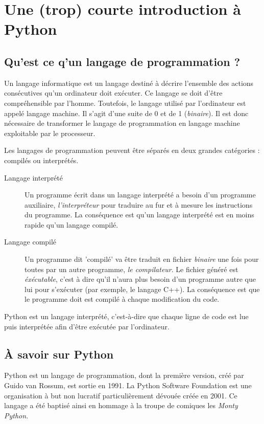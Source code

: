 \section{Une (trop) courte introduction \`a Python}

\subsection{Qu'est ce q'un langage de programmation ?}

Un langage informatique est un langage destin\'e \`a d\'ecrire l'ensemble des actions cons\'ecutives qu'un ordinateur doit ex\'ecuter.
Ce langage se doit d'\^etre compr\'ehensible par l'homme.
Toutefois, le langage utilis\'e par l'ordinateur est appel\'e langage machine.
Il s'agit d'une suite de 0 et de 1 (\textit{binaire}).
Il est donc n\'ecessaire de transformer le langage de programmation en langage
machine exploitable par le processeur.

Les langages de programmation peuvent \^etre s\'epar\'es en deux grandes cat\'egories : compil\'es ou interpr\'et\'es.
\begin{description}
\item[Langage interpr\'et\'e] Un programme \'ecrit dans un langage interpr\'et\'e a besoin d'un programme auxiliaire,
  \textit{l'interpr\'eteur} pour traduire au fur et \`a mesure les instructions du programme.
  La cons\'equence est qu'un langage interpr\'et\'e est en moins rapide qu'un langage compil\'e.


\item[Langage compil\'e] Un programme  dit 'compil\'e' va \^etre traduit en fichier \textit{binaire} une fois pour toutes
  par un autre programme, \textit{le compilateur}.
  Le fichier g\'en\'er\'e est \textit{\'ex\'ecutable}, c'est \`a dire qu'il n'aura plus besoin d'un programme autre
  que lui pour s'ex\'ecuter (par exemple, le langage C++).
  La cons\'equence est que le programme doit est compil\'e \`a chaque modification du code.
\end{description}

Python est un langage interpr\'et\'e, c'est-\`a-dire que chaque ligne de code
est lue puis interpr\'et\'ee afin d'\^etre ex\'ecut\'ee par l'ordinateur.


\subsection{\`A savoir sur Python}


Python est un langage de programmation, dont la première version,
créé par Guido van Rossum, est sortie en 1991.
La Python Software Foundation est une organisation à but
non lucratif particulièrement dévouée créée en 2001.
Ce langage a \'et\'e baptis\'e ainsi en hommage \`a la troupe de
comiques les \textit{Monty Python}.


